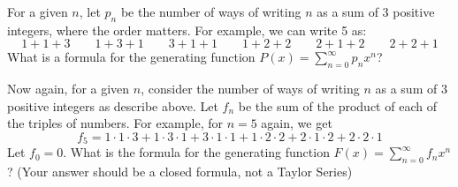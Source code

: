 \documentclass[12pt,twoside]{article}
\begin{document}
\begin{problem}{20}
For a given $n$, let $p_n$ be the number of ways of writing $n$ as a sum of 3 positive integers, where the order matters.  For example, we can write 5 as:
\begin{equation*}
1 + 1 + 3 \qquad 1 + 3 + 1 \qquad 3 + 1 + 1 \qquad 1 + 2 + 2 \qquad 2 + 1 + 2 \qquad 2 + 2 + 1
\end{equation*}
\bparts
{} What is a formula for the generating function $P(x) =  \displaystyle\sum\limits_{n=0}^\infty p_n x^n$?


Now again, for a given $n$, consider the number of ways of writing $n$ as a sum of 3 positive integers as describe above.  Let $f_n$ be the sum of the product of each of the triples of numbers.  For example, for $n = 5$ again, we get 
\begin{equation*}
f_5 = 1 \cdot 1 \cdot 3 + 1 \cdot 3 \cdot 1+ 3 \cdot 1 \cdot 1 + 1 \cdot 2 \cdot 2 + 2 \cdot 1 \cdot 2 + 2 \cdot 2 \cdot 1
\end{equation*} 
%
Let $f_0 = 0$.  
 What is the formula for the generating function $F(x) =  \displaystyle\sum\limits_{n=0}^\infty f_n x^n$? (Your answer should be a closed formula, not a Taylor Series) 


\eparts
\end{problem}


\end{document}
